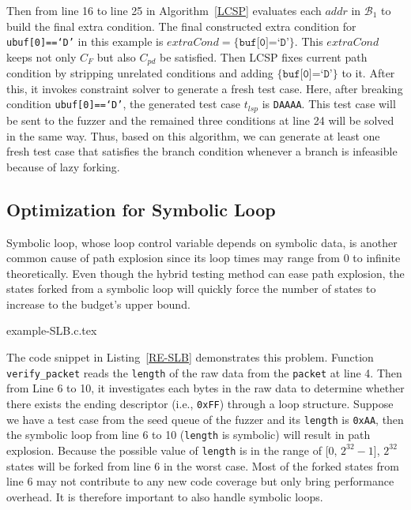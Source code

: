\documentclass{cta-author}
\begin{document}
Then from line 16 to line 25 in Algorithm~\ref{LCSP} evaluates each $addr$ in $\mathcal{B}_1$ to build the final extra condition. The final constructed extra
condition for \texttt{ubuf[0]==`D'} in this example is $extraCond=\{\texttt{buf[0]=`D'}\}$.
This $extraCond$ keeps not only $C_F$ but also $C_{pd}$ be satisfied.
Then LCSP fixes current path condition by stripping unrelated conditions and adding
$\{\texttt{buf[0]=`D'}\}$ to it. After this, it invokes constraint solver to 
generate a fresh test case. Here, after breaking condition \texttt{ubuf[0]==`D'}, the 
generated test case $t_{lsp}$ is \texttt{DAAAA}. This test case will be sent to the fuzzer and the
remained three conditions at line 24 will be solved in the same way. Thus, based on this algorithm, we can generate at least one fresh test case 
that satisfies the branch condition whenever a branch is infeasible 
because of lazy forking. 

\subsection{Optimization for Symbolic Loop}
Symbolic loop, whose loop control variable depends on symbolic data, 
is another common cause of path explosion since its loop times may 
range from 0 to infinite theoretically. 
Even though the hybrid testing method can ease path explosion, the 
states forked from a symbolic loop will quickly force the number of 
states to increase to the budget's upper bound. 


{example-SLB.c.tex} 

The code snippet in Listing~\ref{RE-SLB} demonstrates this problem. 
Function \texttt{verify\_packet} reads the \texttt{length} of the 
raw data from the \texttt{packet} at line 4.
Then from Line 6 to 10, it investigates each bytes in the raw data 
to determine whether there exists the ending descriptor 
(i.e., \texttt{0xFF}) through a loop structure. 
Suppose we have a test case from the seed queue of 
the fuzzer and its \texttt{length} is \texttt{0xAA}, 
then the symbolic loop 
from line 6 to 10 (\texttt{length} is symbolic) 
will result in path explosion.
Because the possible value of \texttt{length} is in the 
range of [0, $2^{32}-1$], $2^{32}$ states will be forked from 
line 6 in the worst case. 
Most of the forked states from line 6 may not contribute 
to any new code coverage but only bring performance overhead.
It is therefore important to also handle symbolic loops. 
\end{document}
